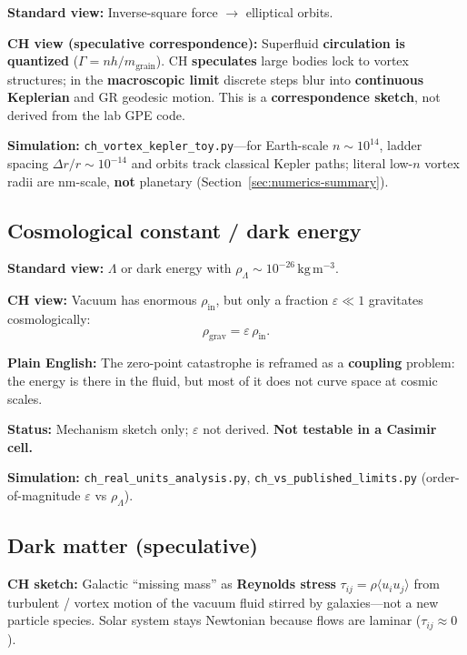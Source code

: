 \documentclass[11pt,a4paper]{article}
\begin{document}
\textbf{Standard view:} Inverse-square force $\to$ elliptical orbits.

\textbf{CH view (speculative correspondence):} Superfluid \textbf{circulation is quantized} ($\Gamma = nh/m_{\mathrm{grain}}$).
CH \textbf{speculates} large bodies lock to vortex structures; in the \textbf{macroscopic limit} discrete steps blur into \textbf{continuous Keplerian} and GR geodesic motion.
This is a \textbf{correspondence sketch}, not derived from the lab GPE code.

\textbf{Simulation:} \texttt{ch\_vortex\_kepler\_toy.py}---for Earth-scale $n \sim 10^{14}$, ladder spacing $\Delta r/r \sim 10^{-14}$ and orbits track classical Kepler paths; literal low-$n$ vortex radii are nm-scale, \textbf{not} planetary (Section~\ref{sec:numerics-summary}).

\subsection{Cosmological constant / dark energy}

\textbf{Standard view:} $\Lambda$ or dark energy with $\rho_\Lambda \sim 10^{-26}\,\mathrm{kg\,m^{-3}}$.

\textbf{CH view:} Vacuum has enormous $\rho_{\mathrm{in}}$, but only a fraction \textbf{$\varepsilon \ll 1$} gravitates cosmologically:
\begin{equation}
  \rho_{\mathrm{grav}} = \varepsilon\,\rho_{\mathrm{in}}.
\end{equation}

\textbf{Plain English:} The zero-point catastrophe is reframed as a \textbf{coupling} problem: the energy is there in the fluid, but most of it does not curve space at cosmic scales.

\textbf{Status:} Mechanism sketch only; $\varepsilon$ not derived.
\textbf{Not testable in a Casimir cell.}

\textbf{Simulation:} \texttt{ch\_real\_units\_analysis.py}, \texttt{ch\_vs\_published\_limits.py} (order-of-magnitude $\varepsilon$ vs $\rho_\Lambda$).

\subsection{Dark matter (speculative)}

\textbf{CH sketch:} Galactic ``missing mass'' as \textbf{Reynolds stress} $\tau_{ij} = \rho\langle u_i u_j\rangle$ from turbulent / vortex motion of the vacuum fluid stirred by galaxies---not a new particle species.
Solar system stays Newtonian because flows are laminar ($\tau_{ij} \approx 0$).
\end{document}
